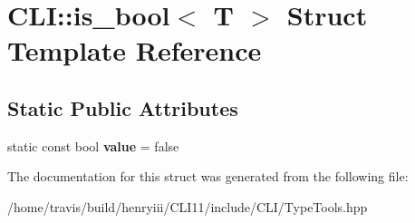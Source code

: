 \hypertarget{struct_c_l_i_1_1is__bool}{}\section{C\+LI\+:\+:is\+\_\+bool$<$ T $>$ Struct Template Reference}
\label{struct_c_l_i_1_1is__bool}
\subsection*{Static Public Attributes}
\begin{DoxyCompactItemize}
\item 
\mbox{\label{struct_c_l_i_1_1is__bool_af31a1a454bf15231195d1a65c093f2f2}} 
static const bool {\bfseries value} = false
\end{DoxyCompactItemize}


The documentation for this struct was generated from the following file\+:\begin{DoxyCompactItemize}
\item 
/home/travis/build/henryiii/\+C\+L\+I11/include/\+C\+L\+I/Type\+Tools.\+hpp\end{DoxyCompactItemize}
